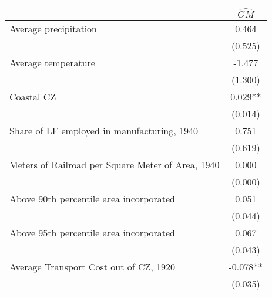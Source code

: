  \begin{tabular}{l*{1}{c}} \toprule
                &\multicolumn{1}{c}{$\widehat{GM}$}\\
\midrule
Average precipitation&    0.464   \\
                &  (0.525)   \\
\addlinespace
Average temperature&   -1.477   \\
                &  (1.300)   \\
\addlinespace
Coastal CZ      &    0.029** \\
                &  (0.014)   \\
\addlinespace
Share of LF employed in manufacturing, 1940&    0.751   \\
                &  (0.619)   \\
\addlinespace
Meters of Railroad per Square Meter of Area, 1940&    0.000   \\
                &  (0.000)   \\
\addlinespace
Above 90th percentile area incorporated&    0.051   \\
                &  (0.044)   \\
\addlinespace
Above 95th percentile area incorporated&    0.067   \\
                &  (0.043)   \\
\addlinespace
Average Transport Cost out of CZ, 1920&   -0.078** \\
                &  (0.035)   \\
 \bottomrule \end{tabular}
